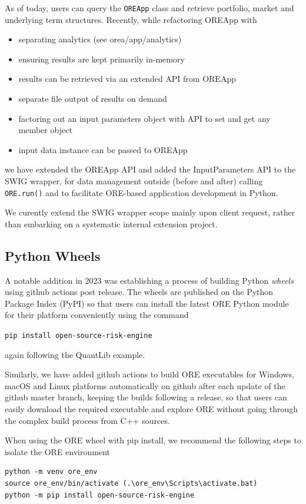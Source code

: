\documentclass[12pt, a4paper]{report}
\begin{document}
As of today, users can query the {\tt OREApp} class and retrieve portfolio, market and underlying
term structures. Recently, while refactoring OREApp with
\begin{itemize}
\item separating analytics (see orea/app/analytics) 
\item ensuring results are kept primarily in-memory
\item results can be retrieved via an extended API from OREApp
\item separate file output of results on demand 
\item factoring out an input parameters object with API to set and get any member object
\item input data instance can be passed to OREApp
\end{itemize}
we have extended the OREApp API and added the InputParameters API to the SWIG wrapper,
for data management outside (before and after) calling {\tt ORE.run()} and to facilitate
ORE-based application development in Python.

We curently extend the SWIG wrapper scope mainly upon client request, rather than embarking
on a systematic internal extension project. 

\subsection*{Python Wheels}

A notable addition in 2023 was establishing a process of building Python {\em wheels} using github
actions post release. The wheels are published on the Python Package Index (PyPI) so that users can
install the latest ORE Python module for their platform conveniently using the command

\centerline{\tt pip install open-source-risk-engine}

again following the QuantLib example.

Similarly, we have added github actions to build ORE executables for Windows, macOS and
Linux platforms automatically on github after each update of the github master branch, keeping
the builds following a release, so that users can easily download the required executable and
explore ORE without going through the complex build process from C++ sources.

When using the ORE wheel with pip install, we recommend the following steps to isolate the ORE environment
\begin{verbatim}
python -m venv ore_env
source ore_env/bin/activate (.\ore_env\Scripts\activate.bat)
python -m pip install open-source-risk-engine
\end{verbatim}
\end{document}
